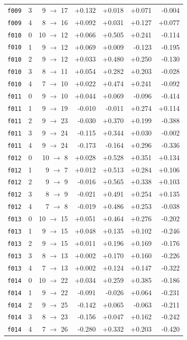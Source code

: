 \documentclass[11pt]{article}
\begin{document}
\begin{table}[htbp]
\begin{tabular}{llrrrrr}
\texttt{f009} & 3 & 9 $\to$ 17 & +0.132 & +0.018 & +0.071 & -0.004 \\
\texttt{f009} & 4 & 8 $\to$ 16 & +0.092 & +0.031 & +0.127 & +0.077 \\
\texttt{f010} & 0 & 10 $\to$ 12 & +0.066 & +0.505 & +0.241 & -0.114 \\
\texttt{f010} & 1 & 9 $\to$ 12 & +0.069 & +0.009 & -0.123 & -0.195 \\
\texttt{f010} & 2 & 9 $\to$ 12 & +0.033 & +0.480 & +0.250 & -0.130 \\
\texttt{f010} & 3 & 8 $\to$ 11 & +0.054 & +0.282 & +0.203 & -0.028 \\
\texttt{f010} & 4 & 7 $\to$ 10 & +0.022 & +0.474 & +0.241 & -0.092 \\
\texttt{f011} & 0 & 9 $\to$ 10 & +0.044 & +0.069 & -0.096 & -0.414 \\
\texttt{f011} & 1 & 9 $\to$ 19 & -0.010 & -0.011 & +0.274 & +0.114 \\
\texttt{f011} & 2 & 9 $\to$ 23 & -0.030 & +0.370 & +0.199 & -0.388 \\
\texttt{f011} & 3 & 9 $\to$ 24 & -0.115 & +0.344 & +0.030 & -0.002 \\
\texttt{f011} & 4 & 9 $\to$ 24 & -0.173 & -0.164 & +0.296 & -0.336 \\
\texttt{f012} & 0 & 10 $\to$ 8 & +0.028 & +0.528 & +0.351 & +0.134 \\
\texttt{f012} & 1 & 9 $\to$ 7 & +0.012 & +0.513 & +0.284 & +0.106 \\
\texttt{f012} & 2 & 9 $\to$ 9 & -0.016 & +0.565 & +0.338 & +0.103 \\
\texttt{f012} & 3 & 8 $\to$ 9 & -0.021 & +0.491 & +0.254 & +0.135 \\
\texttt{f012} & 4 & 7 $\to$ 8 & -0.019 & +0.486 & +0.253 & -0.038 \\
\texttt{f013} & 0 & 10 $\to$ 15 & +0.051 & +0.464 & +0.276 & -0.202 \\
\texttt{f013} & 1 & 9 $\to$ 15 & +0.048 & +0.135 & +0.102 & -0.246 \\
\texttt{f013} & 2 & 9 $\to$ 15 & +0.011 & +0.196 & +0.169 & -0.176 \\
\texttt{f013} & 3 & 8 $\to$ 13 & +0.002 & +0.170 & +0.160 & -0.226 \\
\texttt{f013} & 4 & 7 $\to$ 13 & +0.002 & +0.124 & +0.147 & -0.322 \\
\texttt{f014} & 0 & 10 $\to$ 22 & +0.034 & +0.259 & +0.385 & -0.186 \\
\texttt{f014} & 1 & 9 $\to$ 22 & -0.091 & -0.026 & +0.064 & -0.231 \\
\texttt{f014} & 2 & 9 $\to$ 25 & -0.142 & +0.065 & -0.063 & -0.211 \\
\texttt{f014} & 3 & 8 $\to$ 23 & -0.156 & +0.047 & +0.162 & -0.242 \\
\texttt{f014} & 4 & 7 $\to$ 26 & -0.280 & +0.332 & +0.203 & -0.420 \\
\bottomrule
\end{tabular}
\end{table}
\end{document}
